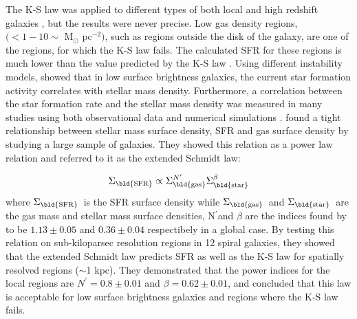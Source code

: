 \documentclass[useAMS,usenatbib]{mn2e}
\newcommand \sigmagas    {$\Sigma_{\rm \bld {gas }} $\ }
\newcommand \eqsigmagas    {\Sigma_{\rm \bld {gas }}}
\newcommand \sigmasfr     {$\Sigma_{\rm \bld {SFR }} $\ }
\newcommand \eqsigmasfr     {\Sigma_{\rm \bld {SFR }}}
\newcommand \sigmastar    {$\Sigma_{\rm \bld {star }} $\ }
\newcommand \eqsigmastar    {\Sigma_{\rm \bld {star }}}
\newcommand \nprime {N$^\prime$}
\newcommand \eqnprime {N^\prime}
\begin{document}
The K-S law was applied to different types of both local and high redshift galaxies \citep[e.g.,][]{Boissier07,Kennicutt07, Bigiel08, Freundlich13}, but the results were never precise. Low gas density regions, $( < 1-10\sim$ M$_{\odot}$ pc$^{-2})$, such as regions outside the disk of the galaxy, are one of the regions, for which the K-S law fails. The calculated SFR for these regions is much lower than the value predicted by the K-S law \citep[e.g.,][]{Martin01, Bigiel08}. Using different instability models, \cite{Hunter98} showed that in low surface brightness galaxies, the current star formation activity correlates with stellar mass density. Furthermore, a correlation between the star formation rate and the stellar mass density was measured in many studies using both observational data and numerical simulations \citep[e.g.][]{Hunter04,Leroy08,Krumholz09,Shi11,Kim11,Kim13}. \cite{Shi11} found a tight relationship between stellar mass surface density, SFR and gas surface density by studying a large sample of galaxies. They showed this relation as a power law relation and referred to it as the extended Schmidt law: %

\begin{equation}
\label{equ:es_org}
\eqsigmasfr \propto \eqsigmagas^{\eqnprime} \eqsigmastar^{\beta}
\end{equation}
where \sigmasfr is the SFR surface density while \sigmagas and \sigmastar are the gas mass and stellar mass surface densities, \nprime and $\beta$ are the indices found by \cite{Shi11} to be $1.13 \pm 0.05$ and $0.36\pm0.04$ respectibely in a global case. By testing this relation on sub-kiloparsec resolution regions in 12 spiral galaxies, they showed that the extended Schmidt law predicts SFR as well as the K-S law for spatially resolved regions ($\sim$1 kpc). They demonstrated that the power indices for the local regions are $\eqnprime = 0.8 \pm 0.01$ and $\beta = 0.62\pm0.01$, and concluded that this law is acceptable for low surface brightness galaxies and regions where the K-S law fails.%
\end{document}
